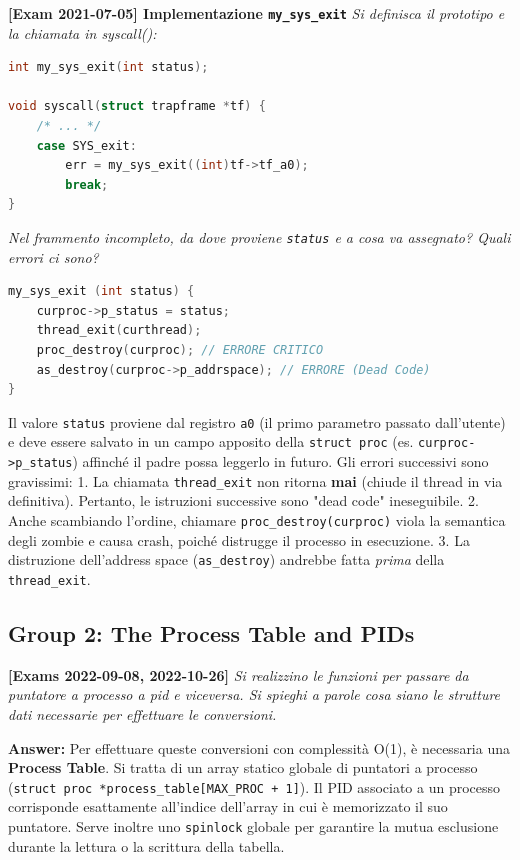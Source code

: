 \vspace{1em}

\textbf{[Exam 2021-07-05] Implementazione \texttt{my\_sys\_exit}}
\textit{Si definisca il prototipo e la chiamata in syscall():}
\begin{lstlisting}[language=C]
int my_sys_exit(int status);

void syscall(struct trapframe *tf) {
    /* ... */
    case SYS_exit:
        err = my_sys_exit((int)tf->tf_a0);
        break;
}
\end{lstlisting}
\textit{Nel frammento incompleto, da dove proviene \texttt{status} e a cosa va assegnato? Quali errori ci sono?}
\begin{lstlisting}[language=C]
my_sys_exit (int status) {
    curproc->p_status = status;
    thread_exit(curthread);
    proc_destroy(curproc); // ERRORE CRITICO
    as_destroy(curproc->p_addrspace); // ERRORE (Dead Code)
}
\end{lstlisting}
Il valore \texttt{status} proviene dal registro \texttt{a0} (il primo parametro passato dall'utente) e deve essere salvato in un campo apposito della \texttt{struct proc} (es. \texttt{curproc->p\_status}) affinché il padre possa leggerlo in futuro.
Gli errori successivi sono gravissimi: 
1. La chiamata \texttt{thread\_exit} non ritorna \textbf{mai} (chiude il thread in via definitiva). Pertanto, le istruzioni successive sono "dead code" ineseguibile.
2. Anche scambiando l'ordine, chiamare \texttt{proc\_destroy(curproc)} viola la semantica degli zombie e causa crash, poiché distrugge il processo in esecuzione. 
3. La distruzione dell'address space (\texttt{as\_destroy}) andrebbe fatta \textit{prima} della \texttt{thread\_exit}.

\newpage
\subsection*{Group 2: The Process Table and PIDs}

\textbf{[Exams 2022-09-08, 2022-10-26]}
\textit{Si realizzino le funzioni per passare da puntatore a processo a pid e viceversa. Si spieghi a parole cosa siano le strutture dati necessarie per effettuare le conversioni.}

\textbf{Answer:}
Per effettuare queste conversioni con complessità O(1), è necessaria una \textbf{Process Table}. Si tratta di un array statico globale di puntatori a processo (\texttt{struct proc *process\_table[MAX\_PROC + 1]}). Il PID associato a un processo corrisponde esattamente all'indice dell'array in cui è memorizzato il suo puntatore. Serve inoltre uno \texttt{spinlock} globale per garantire la mutua esclusione durante la lettura o la scrittura della tabella.

